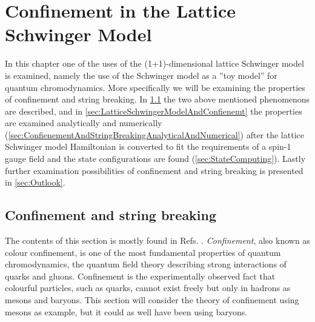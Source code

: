 \documentclass[../main.tex]{subfiles} %
\begin{document}
\chapter{Confinement in the Lattice Schwinger Model} \label{chap:Confinement}


In this chapter one of the uses of the (1+1)-dimensional lattice Schwinger model is examined, namely the use of the Schwinger model as a ''toy model'' for quantum chromodynamics. More specifically we will be examining the properties of confinement and string breaking. In \cref{sec:Confinement} the two above mentioned phenomenons are described, and in \cref{sec:LatticeSchwingerModelAndConfienemt} the properties are examined analytically and numerically (\cref{sec:ConfienementAndStringBreakingAnalyticalAndNumerical}) after the lattice Schwinger model Hamiltonian is converted to fit the requirements of a spin-1 gauge field and the state configurations are found (\cref{sec:StateComputing}). Lastly further examination possibilities of confinement and string breaking is presented in \cref{sec:Outlook}.




\section{Confinement and string breaking} \label{sec:Confinement}

The contents of this section is mostly found in Refs. \cite{smit_introToQuantumFieldsOnALattice_2003, griffiths_introToElementaryParticles_2008}. \emph{Confinement}, also known as colour confinement, is one of the most fundamental properties of quantum chromodynamics, the quantum field theory describing strong interactions of quarks and gluons. Confinement is the experimentally observed fact that colourful particles, such as quarks, cannot exist freely but only in hadrons as mesons and baryons. This section will consider the theory of confinement using mesons as example, but it could as well have been using baryons.
\end{document}
